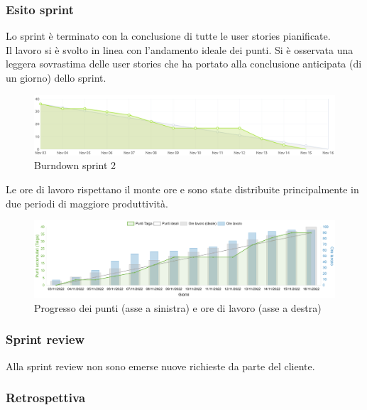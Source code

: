 \newpage
\subsubsection{Esito sprint}
Lo sprint è terminato con la conclusione di tutte le user stories pianificate.\\
Il lavoro si è svolto in linea con l'andamento ideale dei punti. 
Si è osservata una leggera sovrastima delle user stories che ha portato alla conclusione anticipata (di un giorno) dello sprint.\\
\begin{figure}[H]
    \centering
    \includegraphics[width=15cm]{./img/sprint2/burndown.png}
    \caption{Burndown sprint 2}
\end{figure}
Le ore di lavoro rispettano il monte ore e sono state distribuite principalmente in due periodi di maggiore produttività.
\begin{figure}[H]
    \centering
    \includegraphics[width=15cm]{./img/sprint2/worktime.png}
    \caption{Progresso dei punti (asse a sinistra) e ore di lavoro (asse a destra)}
\end{figure}


\subsubsection{Sprint review}
Alla sprint review non sono emerse nuove richieste da parte del cliente.


\subsubsection{Retrospettiva} \label{sprint1_retrospettiva}
